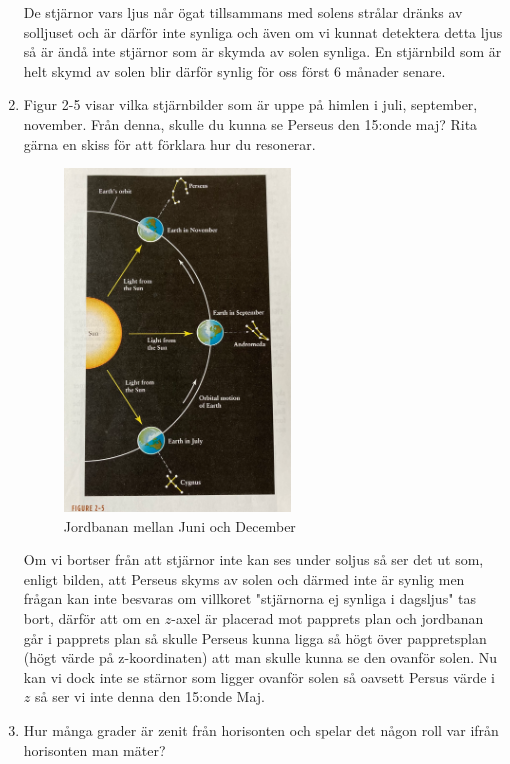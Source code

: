 \documentclass[./exercises.tex]{subfiles}
\begin{document}
\begin{enumerate}
De stjärnor vars ljus når ögat tillsammans med solens strålar dränks av solljuset och är därför inte synliga och även om vi
kunnat detektera detta ljus så är ändå inte stjärnor som är skymda av solen synliga.
En stjärnbild som är helt skymd av solen blir därför synlig för oss först 6 månader senare.

\item Figur 2-5 visar vilka stjärnbilder
som är uppe på himlen i juli, september, november. Från denna,
skulle du kunna se Perseus den 15:onde maj? Rita gärna en skiss
för att förklara hur du resonerar.\\

\begin{figure}[H]
\centering
  \includegraphics[width=60mm,scale=0.4]{bana.png}
  \caption{Jordbanan mellan Juni och December}
  \label{fig4}
\end{figure}

Om vi bortser från att stjärnor inte kan ses under soljus så ser det ut som, enligt bilden, att Perseus skyms av solen och därmed inte är synlig men frågan
kan inte besvaras om villkoret "stjärnorna ej synliga i dagsljus" tas bort, därför att om en $z$-axel är placerad mot papprets plan
och jordbanan går i papprets plan så skulle Perseus kunna ligga så högt över pappretsplan (högt värde på z-koordinaten)
att man skulle kunna se den ovanför solen.
Nu kan vi dock inte se stärnor som ligger ovanför solen så oavsett Persus värde i $z$ så ser vi inte denna den 15:onde Maj.

\item Hur många grader är zenit från horisonten
och spelar det någon roll var ifrån horisonten man mäter?\\


\end{enumerate}
\end{document}
